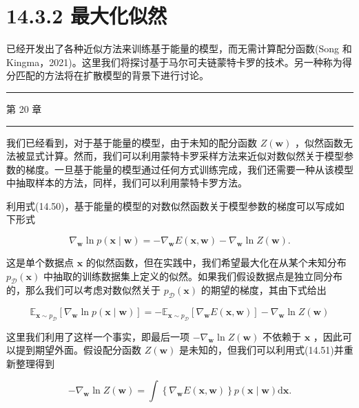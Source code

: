 \documentclass[10pt]{report}
\newcommand{\HRule}{\begin{center}\rule{0.9\linewidth}{0.2mm}\end{center}}
\begin{document}
\section*{14.3.2 最大化似然}

已经开发出了各种近似方法来训练基于能量的模型，而无需计算配分函数(Song 和 Kingma，2021)。这里我们将探讨基于马尔可夫链蒙特卡罗的技术。另一种称为得分匹配的方法将在扩散模型的背景下进行讨论。

\HRule

第 20 章

\HRule

我们已经看到，对于基于能量的模型，由于未知的配分函数 \(Z\left( \mathbf{w}\right)\) ，似然函数无法被显式计算。然而，我们可以利用蒙特卡罗采样方法来近似对数似然关于模型参数的梯度。一旦基于能量的模型通过任何方式训练完成，我们还需要一种从该模型中抽取样本的方法，同样，我们可以利用蒙特卡罗方法。

利用式(14.50)，基于能量的模型的对数似然函数关于模型参数的梯度可以写成如下形式

\[
{\nabla }_{\mathbf{w}}\ln p\left( {\mathbf{x} \mid  \mathbf{w}}\right)  =  - {\nabla }_{\mathbf{w}}E\left( {\mathbf{x},\mathbf{w}}\right)  - {\nabla }_{\mathbf{w}}\ln Z\left( \mathbf{w}\right) . \tag{14.53}
\]

这是单个数据点 \(\mathbf{x}\) 的似然函数，但在实践中，我们希望最大化在从某个未知分布 \({p}_{\mathcal{D}}\left( \mathbf{x}\right)\) 中抽取的训练数据集上定义的似然。如果我们假设数据点是独立同分布的，那么我们可以考虑对数似然关于 \({p}_{\mathcal{D}}\left( \mathbf{x}\right)\) 的期望的梯度，其由下式给出

\[
{\mathbb{E}}_{\mathbf{x} \sim  {p}_{\mathcal{D}}}\left\lbrack  {{\nabla }_{\mathbf{w}}\ln p\left( {\mathbf{x} \mid  \mathbf{w}}\right) }\right\rbrack   =  - {\mathbb{E}}_{\mathbf{x} \sim  {p}_{\mathcal{D}}}\left\lbrack  {{\nabla }_{\mathbf{w}}E\left( {\mathbf{x},\mathbf{w}}\right) }\right\rbrack   - {\nabla }_{\mathbf{w}}\ln Z\left( \mathbf{w}\right)  \tag{14.54}
\]

这里我们利用了这样一个事实，即最后一项 \(- {\nabla }_{\mathbf{w}}\ln Z\left( \mathbf{w}\right)\) 不依赖于 \(\mathbf{x}\) ，因此可以提到期望外面。假设配分函数 \(Z\left( \mathbf{w}\right)\) 是未知的，但我们可以利用式(14.51)并重新整理得到

\[
- {\nabla }_{\mathbf{w}}\ln Z\left( \mathbf{w}\right)  = \int \left\{  {{\nabla }_{\mathbf{w}}E\left( {\mathbf{x},\mathbf{w}}\right) }\right\}  p\left( {\mathbf{x} \mid  \mathbf{w}}\right) \mathrm{d}\mathbf{x}. \tag{14.55}
\]
\end{document}
